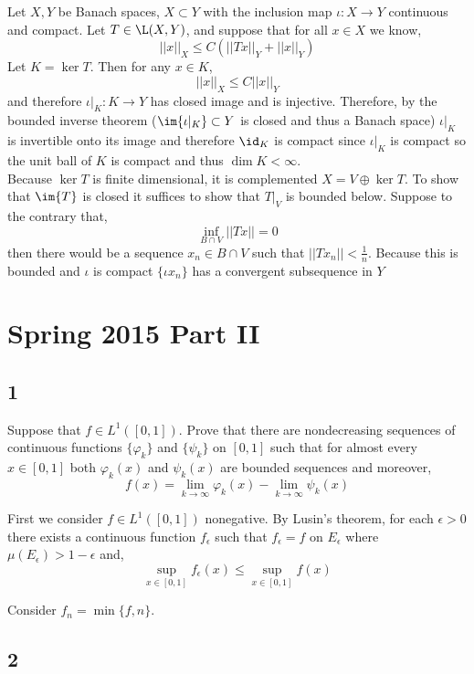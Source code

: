 \documentclass[12pt]{article}
\begin{document}
Let $X, Y$ be Banach spaces, $X \subset Y$ with the inclusion map $\iota : X \to Y$ continuous and compact. Let $T \in \L(X, Y)$, and suppose that for all $x \in X$ we know,
\[ || x ||_X \le C \left( || T x ||_Y  + || x ||_Y \right) \]
Let $K = \ker{T}$. Then for any $x \in K$,
\[ || x ||_X \le C || x ||_Y \]
and therefore $\iota|_K : K \to Y$ has closed image and is injective. Therefore, by the bounded inverse theorem ($\im{\iota|_K} \subset Y$ is closed and thus a Banach space) $\iota|_K$ is invertible onto its image and therefore $\id_K$ is compact since $\iota|_K$ is compact so the unit ball of $K$ is compact and thus $\dim{K} < \infty$.
\bigskip\\
Because $\ker{T}$ is finite dimensional, it is complemented $X = V \oplus \ker{T}$. To show that $\im{T}$ is closed it suffices to show that $T |_V$ is bounded below. Suppose to the contrary that,
\[ \inf_{B \cap V} || T x || = 0 \]
then there would be a sequence $x_n \in B \cap V$ such that $|| T x_n || < \frac{1}{n}$. Because this is bounded and $\iota$ is compact $\{ \iota x_n \}$ has a convergent subsequence in $Y$ 


\section{Spring 2015 Part II}

\subsection{1}

\begin{exercise}
Suppose that $f \in L^1([0,1])$. Prove that there are nondecreasing sequences of continuous functions $\{ \varphi_k \}$ and $\{ \psi_k \}$ on $[0,1]$ such that for almost every $x \in [0,1]$ both $\varphi_k(x)$ and $\psi_k(x)$ are bounded sequences and moreover,
\[ f(x) = \lim_{k \to \infty} \varphi_k(x) - \lim_{k \to \infty} \psi_k(x) \]
\end{exercise}

First we consider $f \in L^1([0,1])$ nonegative. By Lusin's theorem, for each $\epsilon > 0$ there exists a continuous function $f_\epsilon$ such that $f_\epsilon = f$ on $E_\epsilon$ where $\mu(E_\epsilon) > 1 - \epsilon$ and,
\[ \sup_{x \in [0,1]} f_\epsilon(x) \le \sup_{x \in [0,1]} f(x) \]


Consider $f_n = \min\{f, n \}$. 

\subsection{2}
\end{document}
